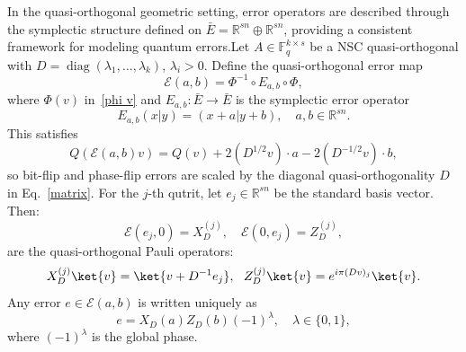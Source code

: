 \documentclass{iopjournal}
\theoremstyle{thmstyleone}%
\theoremstyle{thmstyletwo}%
\theoremstyle{thmstylethree}%
\begin{document}

In the quasi-orthogonal geometric setting, error operators are described through the symplectic structure defined on $\bar{E} = \mathbb{R}^{sn} \oplus \mathbb{R}^{sn}$, providing a consistent framework for modeling quantum errors.Let $A \in \mathbb{F}_q^{k \times s}$ be a NSC quasi-orthogonal with $ D = \operatorname{diag}(\lambda_1, \dots, \lambda_k)$, $\lambda_i > 0$. Define the quasi-orthogonal error map
\begin{equation}
\label{eq:quasi-error-map}
\mathcal{E}(a,b) = \Phi^{-1} \circ E_{a,b} \circ \Phi,
\end{equation}
where $\Phi(v)$ in~\eqref{phi v} and $E_{a,b}: \bar{E} \to \bar{E}$ is the symplectic error operator
\begin{equation}
E_{a,b}(x|y) = (x + a|y + b), \quad a, b \in \mathbb{R}^{sn}.
\end{equation}
This satisfies
\begin{equation}
Q(\mathcal{E}(a,b)v) = Q(v) + 2 (D^{1/2} v) \cdot a - 2 (D^{-1/2} v) \cdot b,
\end{equation}
so bit-flip and phase-flip errors are scaled by the diagonal quasi-orthogonality $D$ in Eq.~\eqref{matrix}. For the $j$-th qutrit, let $e_j \in \mathbb{R}^{sn}$ be the standard basis vector. Then:
\begin{equation}
\mathcal{E}(e_j, 0) = X_D^{(j)}, \quad \mathcal{E}(0, e_j) = Z_D^{(j)},
\end{equation}
are the quasi-orthogonal Pauli operators:
\begin{equation}
X_D^{(j)} \ket{v} = \ket{v + D^{-1} e_j},~~
Z_D^{(j)} \ket{v} = e^{i \pi (D v)_j} \ket{v}.\label{Pauli operator}
\end{equation}
Any error $e \in \mathcal{E}(a,b)$ is written uniquely as
\begin{equation}
\label{eq:quasi-pauli-decomp}
e = X_D(a) Z_D(b) (-1)^\lambda, \quad \lambda \in \{0,1\},
\end{equation}
where $(-1)^\lambda$ is the global phase.
\end{document}
